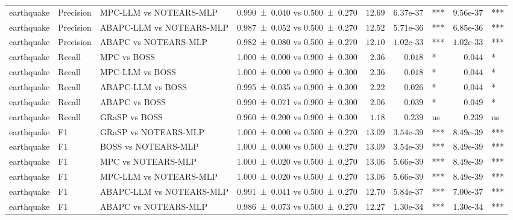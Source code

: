 \begin{table}[t]
{\begin{tabular}{ll l|c|r|rl|rl}
    earthquake & Precision & MPC-LLM vs NOTEARS-MLP & \num{0.990 +- 0.040} vs \num{0.500 +- 0.270} & $12.69$ & $6.37\text{e-}37$ & \!\!\!*** & $9.56\text{e-}37$ & \!\!\!*** \\
    earthquake & Precision & ABAPC-LLM vs NOTEARS-MLP & \num{0.987 +- 0.052} vs \num{0.500 +- 0.270} & $12.52$ & $5.71\text{e-}36$ & \!\!\!*** & $6.85\text{e-}36$ & \!\!\!*** \\
    earthquake & Precision & ABAPC vs NOTEARS-MLP & \num{0.982 +- 0.080} vs \num{0.500 +- 0.270} & $12.10$ & $1.02\text{e-}33$ & \!\!\!*** & $1.02\text{e-}33$ & \!\!\!*** \\
    earthquake & Recall & MPC vs BOSS & \num{1.000 +- 0.000} vs \num{0.900 +- 0.300} & $2.36$ & $0.018$ & \!\!\!* & $0.044$ & \!\!\!* \\
    earthquake & Recall & MPC-LLM vs BOSS & \num{1.000 +- 0.000} vs \num{0.900 +- 0.300} & $2.36$ & $0.018$ & \!\!\!* & $0.044$ & \!\!\!* \\
    earthquake & Recall & ABAPC-LLM vs BOSS & \num{0.995 +- 0.035} vs \num{0.900 +- 0.300} & $2.22$ & $0.026$ & \!\!\!* & $0.044$ & \!\!\!* \\
    earthquake & Recall & ABAPC vs BOSS & \num{0.990 +- 0.071} vs \num{0.900 +- 0.300} & $2.06$ & $0.039$ & \!\!\!* & $0.049$ & \!\!\!* \\
    earthquake & Recall & GRaSP vs BOSS & \num{0.960 +- 0.200} vs \num{0.900 +- 0.300} & $1.18$ & $0.239$ & \!\!\!ns & $0.239$ & \!\!\!ns \\
    earthquake & F1 & GRaSP vs NOTEARS-MLP & \num{1.000 +- 0.000} vs \num{0.500 +- 0.270} & $13.09$ & $3.54\text{e-}39$ & \!\!\!*** & $8.49\text{e-}39$ & \!\!\!*** \\
    earthquake & F1 & BOSS vs NOTEARS-MLP & \num{1.000 +- 0.000} vs \num{0.500 +- 0.270} & $13.09$ & $3.54\text{e-}39$ & \!\!\!*** & $8.49\text{e-}39$ & \!\!\!*** \\
    earthquake & F1 & MPC vs NOTEARS-MLP & \num{1.000 +- 0.020} vs \num{0.500 +- 0.270} & $13.06$ & $5.66\text{e-}39$ & \!\!\!*** & $8.49\text{e-}39$ & \!\!\!*** \\
    earthquake & F1 & MPC-LLM vs NOTEARS-MLP & \num{1.000 +- 0.020} vs \num{0.500 +- 0.270} & $13.06$ & $5.66\text{e-}39$ & \!\!\!*** & $8.49\text{e-}39$ & \!\!\!*** \\
    earthquake & F1 & ABAPC-LLM vs NOTEARS-MLP & \num{0.991 +- 0.041} vs \num{0.500 +- 0.270} & $12.70$ & $5.84\text{e-}37$ & \!\!\!*** & $7.00\text{e-}37$ & \!\!\!*** \\
    earthquake & F1 & ABAPC vs NOTEARS-MLP & \num{0.986 +- 0.073} vs \num{0.500 +- 0.270} & $12.27$ & $1.30\text{e-}34$ & \!\!\!*** & $1.30\text{e-}34$ & \!\!\!*** \\

\end{tabular}}
\end{table}
